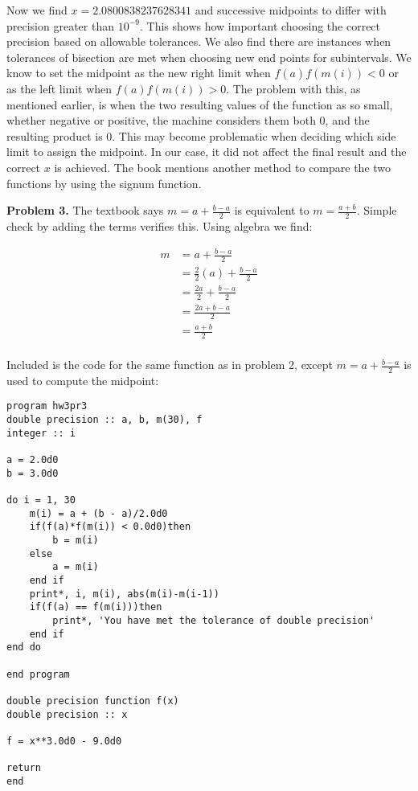 \documentclass[12pt]{article}
\begin{document}
Now we find $x=2.0800838237628341$ and successive midpoints to differ with precision greater than $10^{-9}$. This shows how important choosing the correct precision based on allowable tolerances. We also find there are instances when tolerances of bisection are met when choosing new end points for subintervals. We know to set the midpoint as the new right limit when $f(a)f(m(i))<0$ or as the left limit when $f(a)f(m(i))>0$. The problem with this, as mentioned earlier, is when the two resulting values of the function as so small, whether negative or positive, the machine considers them both 0, and the resulting product is 0. This may become problematic when deciding which side limit to assign the midpoint. In our case, it did not affect the final result and the correct $x$ is achieved. The book mentions another method to compare the two functions by using the signum function.

\bigskip

\textbf{Problem 3.} The textbook says $m=a+\frac{b-a}{2}$ is equivalent to $m=\frac{a+b}{2}$. Simple check by adding the terms verifies this. Using algebra we find:

\begin{align*}
m &= a+\frac{b-a}{2}\\
&= \frac{2}{2}(a)+\frac{b-a}{2}\\
&= \frac{2a}{2}+\frac{b-a}{2}\\
&= \frac{2a+b-a}{2}\\
&= \frac{a+b}{2}\\
\end{align*}

Included is the code for the same function as in problem 2, except $m=a+\frac{b-a}{2}$ is used to compute the midpoint:

\begin{verbatim}
program hw3pr3
double precision :: a, b, m(30), f
integer :: i 

a = 2.0d0
b = 3.0d0

do i = 1, 30 
	m(i) = a + (b - a)/2.0d0
	if(f(a)*f(m(i)) < 0.0d0)then
		b = m(i)
	else
		a = m(i)
	end if
	print*, i, m(i), abs(m(i)-m(i-1))
	if(f(a) == f(m(i)))then
		print*, 'You have met the tolerance of double precision'
	end if
end do

end program

double precision function f(x)
double precision :: x

f = x**3.0d0 - 9.0d0

return
end
\end{verbatim}
\end{document}
